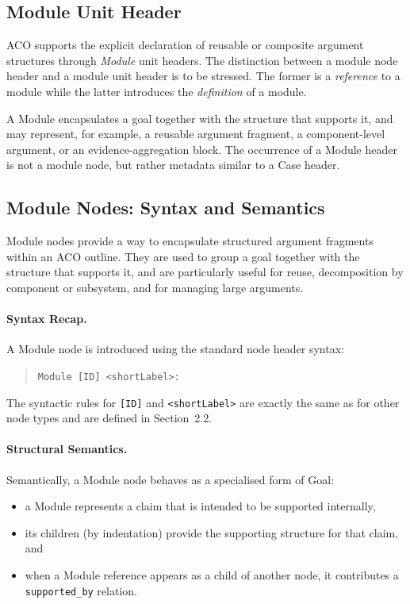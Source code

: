 \documentclass[11pt]{article}
\begin{document}
\subsection{Module Unit Header}

ACO supports the explicit declaration of reusable or composite argument structures through
\emph{Module} unit headers.
The distinction between a module node header and a module unit header is to be stressed. The former is a \emph{reference} to a module while the latter introduces the \emph{definition} of a module.

A Module encapsulates a goal together with the structure that supports it,
and may represent, for example, a reusable argument fragment, a component-level argument,
or an evidence-aggregation block.
The occurrence of a Module header is not a module node, but rather metadata similar to a Case header.
%

\subsection{Module Nodes: Syntax and Semantics}
\label{sec:module-semantics}

Module nodes provide a way to encapsulate structured argument fragments within an
ACO outline. They are used to group a goal together with the structure that supports
it, and are particularly useful for reuse, decomposition by component or subsystem,
and for managing large arguments.

\paragraph{Syntax Recap.}
A Module node is introduced using the standard node header syntax:
\begin{quote}
\texttt{Module [ID] \textless shortLabel\textgreater:}
\end{quote}
The syntactic rules for \texttt{[ID]} and \texttt{\textless shortLabel\textgreater{}}
are exactly the same as for other node types and are defined in Section~2.2.

\paragraph{Structural Semantics.}
Semantically, a Module node behaves as a specialised form of Goal:
\begin{itemize}[leftmargin=2em]
  \item a Module represents a claim that is intended to be supported internally,
  \item its children (by indentation) provide the supporting structure for that claim, and
  \item when a Module reference appears as a child of another node, it contributes a
        \texttt{supported\_by} relation.
\end{itemize}
\end{document}
